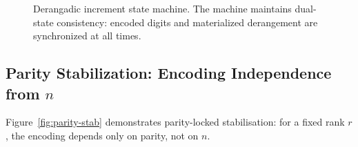 \documentclass[11pt,a4paper]{article}
\newcommand{\subfact}[1]{!{#1}} %
\begin{document}
\begin{figure}[h]
        \caption{Derangadic increment state machine. The machine maintains dual-state consistency: encoded digits and materialized derangement are synchronized at all times.}
        \label{fig:state-machine}
    \end{figure}

    \subsection{Parity Stabilization: Encoding Independence from $n$}

    Figure~\ref{fig:parity-stab} demonstrates parity-locked stabilisation: for a fixed rank $r$, the encoding depends only on parity, not on $n$.
\end{document}
